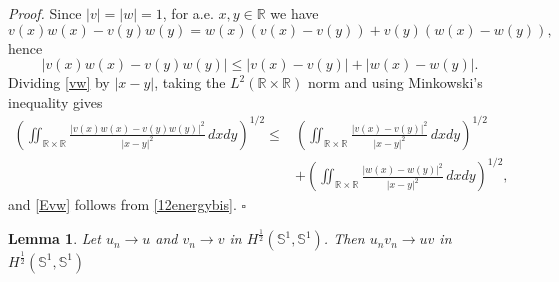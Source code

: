 \documentclass[12pt, a4paper]{article}
\newtheorem{lem}[thm]{Lemma}
\newenvironment{proof}{\noindent\emph{Proof.}}{\hfill$\square$\medskip}
\newcommand{\sph}{\mathbb{S}}
\newcommand{\R}{\mathbb{R}}
\renewcommand{\(}{\left(}
\renewcommand{\)}{\right)}
\begin{document}
\begin{proof}
Since $|v|=|w|=1$, for a.e. $x,y\in\R$ we have
\[
v(x)w(x)-v(y)w(y)=w(x)(v(x)-v(y))+v(y)(w(x)-w(y)),
\]
hence
\begin{equation}\label{vw}
|v(x)w(x)-v(y)w(y)|
\le |v(x)-v(y)|+|w(x)-w(y)|.
\end{equation}
Dividing \eqref{vw} by $|x-y|$, taking the $L^2(\R\times\R)$ norm and using Minkowski's inequality gives
\[\begin{split}
\left(\iint_{\R\times\R}\frac{|v(x)w(x)-v(y)w(y)|^2}{|x-y|^2}\,dxdy\right)^{1/2}
\le&
\left(\iint_{\R\times\R}\frac{|v(x)-v(y)|^2}{|x-y|^2}\,dxdy\right)^{1/2}\\
&
+
\left(\iint_{\R\times\R}\frac{|w(x)-w(y)|^2}{|x-y|^2}\,dxdy\right)^{1/2},
\end{split}
\]
and \eqref{Evw} follows from \eqref{12energybis}.
\end{proof}

\begin{lem}\label{lemunvn}
Let $u_n\to u$ and $v_n\to v$ in $H^{\frac12}(\sph^1,\sph^1)$.
Then
$ u_nv_n\to uv$ in $H^{\frac12}(\sph^1,\sph^1)$
\end{lem}
\end{document}
